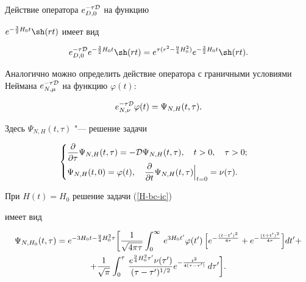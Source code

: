 Действие оператора $e^{-\tau{\cal D}}_{D,0}$ на функцию

$e^{-\frac32H_0t}\sh (rt)$ имеет вид

\begin{equation}

e^{-\tau{\cal D}}_{D,0}e^{-\frac32H_0t}\sh (rt)=

e^{\tau (r^2-\frac94H_0^2)}e^{-\frac32H_0t}\sh  (rt).

\label{sinh-mu-H0}

\end{equation}



Аналогично можно определить действие оператора с граничными условиями Неймана $e^{-\tau\cal D}_{N,\mu}$ на функцию $\varphi(t)$:

\begin{equation*}

e^{-\tau\cal D}_{N,\nu}\varphi(t)=\Psi _{N,H}(t,\tau).

\end{equation*}

Здесь $\Psi_{N,H}(t,\tau)$ "--- решение задачи

\begin{equation}

\label{H-bc-ic}

\begin{cases}

\displaystyle

\frac{\partial}{\partial \tau}\Psi_ {N,H}(t,\tau)=

-{\cal D}\Psi _{N,H}(t,\tau),\quad t>0,\quad \tau>0; \vspace{1mm}\\

\displaystyle \Psi _{N,H}(t, 0)=\varphi(t),\quad 

\frac{\partial}{\partial t}\Psi _{N,H}(t,\tau)\Big|_{t=0}=\nu(\tau).

\end{cases}\end{equation}

При $H(t)=H_0$ решение задачи (\ref{H-bc-ic})

имеет вид

\begin{multline*}

\Psi_ {N,H_0}(t,\tau)=e^{-3H_0t-\frac94H_0^2\tau}

\biggl[\frac{1}{\sqrt{4\pi \tau}}\int _0^\infty \,

e^{3H_0t^\prime}\varphi(t^\prime)\,

\Bigl[e^{-\frac{(t-t')^2}{4\tau}}+e^{-\frac{(t+t')^2}{4\tau}}\Bigr]dt' +\\

+\frac{1}{\sqrt{\pi }}\int _0^\tau\,

\frac{e^{\frac94H_0^2\tau'}\nu(\tau')}{(\tau-\tau')^{1/2}}e^{-\frac{t^2}

{4(\tau-\tau')}}\,d\tau'\biggr].


\end{multline*}

